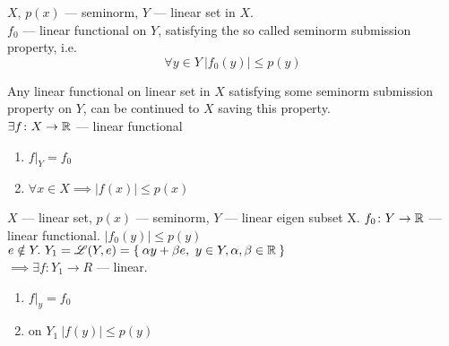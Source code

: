 $X$, $p(x)$ --- seminorm, $Y$ --- linear set in $X$. \\
$f_0$ --- linear functional on $Y$, satisfying the so called 
seminorm submission property, i.e. 
\[
  \forall y \in Y\ |f_0(y)| \leq p(y)
\]

\begin{thm}
  Any linear functional on linear set in $X$ satisfying some
  seminorm submission property on $Y$, can be continued to $X$ saving this
  property. \\
  $\exists f\colon X \to \mathbb{R}$ --- linear functional
  \begin{enumerate}
  \item $f|_Y = f_0$
  \item $\forall x \in X \implies |f(x)| \leq p(x)$
  \end{enumerate}
\end{thm}

\begin{lemma}[Banach]
  $X$ --- linear set, $p(x)$ --- seminorm, $Y$ --- linear eigen subset X.
  $f_0 \colon Y \to \mathbb{R}$ --- linear functional. $|f_0(y)| \leq p(y)$ \\
  $e \notin Y.\ Y_1 = \mathscr{L}(Y, e) = \Set{\alpha y + \beta e,\ y \in Y, \alpha,
    \beta \in \mathbb{R}}$ \\
  $\implies \exists f \colon Y_1 \to R$ --- linear.
  \begin{enumerate}
  \item $f|_y = f_0$
  \item on $Y_1\ |f(y)| \leq p(y)$
  \end{enumerate}
\end{lemma}

